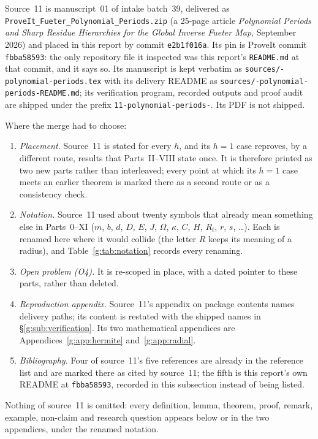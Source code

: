 \documentclass[11pt,a4paper]{article}
\numberwithin{equation}{section}
\theoremstyle{definition}
\theoremstyle{remark}
\theoremstyle{plain}
\newcommand{\hy}{-\allowbreak}                 %
\begin{document}
Source~11 is manuscript~01 of intake batch~39, delivered as
\texttt{ProveIt\_\allowbreak Fueter\_\allowbreak Polynomial\_\allowbreak Periods.zip} (a 25-page article
\emph{Polynomial Periods and Sharp Residue Hierarchies for the Global Inverse
Fueter Map}, September 2026) and placed in this report by commit
\texttt{e2b1f016a}. Its pin is ProveIt commit \texttt{fbba58593}: the only
repository file it inspected was this report's \texttt{README.md} at that
commit, and it says so. Its manuscript is kept verbatim as
\texttt{sources/\hy polynomial\hy periods.tex} with its delivery README as
\texttt{sources/\hy polynomial\hy periods\hy README.md}; its verification program,
recorded outputs and proof audit are shipped under the prefix
\texttt{11\hy polynomial\hy periods\hy }. Its PDF is not shipped.

Where the merge had to choose:
\begin{enumerate}[label=\textup{(\roman*)}]
\item \emph{Placement.} Source~11 is stated for every $h$, and its $h=1$ case
reproves, by a different route, results that Parts~II--VIII state once. It is
therefore printed as two new parts rather than interleaved; every point at
which its $h=1$ case meets an earlier theorem is marked there as a second
route or as a consistency check.
\item \emph{Notation.} Source~11 used about twenty symbols that already mean
something else in Parts~0--XI ($m$, $b$, $d$, $D$, $E$, $J$, $\Omega$,
$\kappa$, $C$, $H$, $R_t$, $r$, $s$, \ldots). Each is renamed here where it
would collide (the letter $R$ keeps its meaning of a radius), and
Table~\ref{g:tab:notation} records every renaming.
\item \emph{Open problem (O4).} It is re-scoped in place, with a dated
pointer to these parts, rather than deleted.
\item \emph{Reproduction appendix.} Source~11's appendix on package contents
names delivery paths; its content is restated with the shipped names in
\S\ref{g:sub:verification}. Its two mathematical appendices are
Appendices~\ref{g:app:hermite} and~\ref{g:app:radial}.
\item \emph{Bibliography.} Four of source~11's five references are already in
the reference list and are marked there as cited by source~11; the fifth is
this report's own README at \texttt{fbba58593}, recorded in this subsection
instead of being listed.
\end{enumerate}
Nothing of source~11 is omitted: every definition, lemma, theorem, proof,
remark, example, non-claim and research question appears below or in the two
appendices, under the renamed notation.
\end{document}
